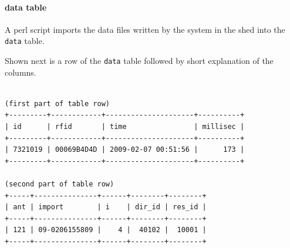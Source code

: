 \paragraph{data table}
\label{para:data_table}

A \ac{perl} script imports the data files written by the system in the shed into the \lstinline|data| table. 

Shown next is a row of the \lstinline|data| table followed by short explanation of the columns.

\codescript
\begin{lstlisting}[frame=none]

(first part of table row)
+---------+------------+---------------------+----------+
| id      | rfid       | time                | millisec |
+---------+------------+---------------------+----------+
| 7321019 | 00069B4D4D | 2009-02-07 00:51:56 |      173 |
+---------+------------+---------------------+----------+

(second part of table row)
+-----+---------------+------+--------+--------+
| ant | import        | i    | dir_id | res_id |
+-----+---------------+------+--------+--------+
| 121 | 09-0206155809 |    4 |  40102 |  10001 |
+-----+---------------+------+--------+--------+

\end{lstlisting}

